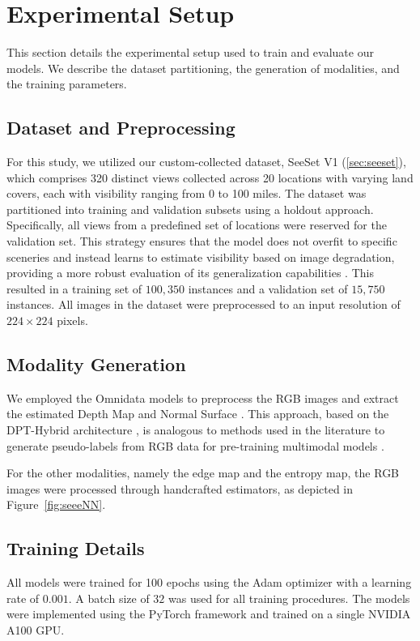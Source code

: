 \section{Experimental Setup}
\label{sec:experimental_setup}

This section details the experimental setup used to train and evaluate our models. We describe the dataset partitioning, the generation of modalities, and the training parameters.

\subsection{Dataset and Preprocessing}

For this study, we utilized our custom-collected dataset, SeeSet V1 (\ref{sec:seeset}), which comprises 320 distinct views collected across 20 locations with varying land covers, each with visibility ranging from 0 to 100 miles. The dataset was partitioned into training and validation subsets using a holdout approach. Specifically, all views from a predefined set of locations were reserved for the validation set. This strategy ensures that the model does not overfit to specific sceneries and instead learns to estimate visibility based on image degradation, providing a more robust evaluation of its generalization capabilities \cite{Bouhsine2022}. This resulted in a training set of $100,350$ instances and a validation set of $15,750$ instances. All images in the dataset were preprocessed to an input resolution of $224 \times 224$ pixels.

\subsection{Modality Generation}

We employed the Omnidata models to preprocess the RGB images and extract the estimated Depth Map and Normal Surface \cite{eftekhar2021omnidata}. This approach, based on the DPT-Hybrid architecture \cite{ranftl2021vision}, is analogous to methods used in the literature to generate pseudo-labels from RGB data for pre-training multimodal models \cite{bachmann2022multimae, wang2024largescale}.

For the other modalities, namely the edge map and the entropy map, the RGB images were processed through handcrafted estimators, as depicted in Figure~\ref{fig:seeeNN}.

\subsection{Training Details}

All models were trained for 100 epochs using the Adam optimizer with a learning rate of $0.001$. A batch size of $32$ was used for all training procedures. The models were implemented using the PyTorch framework and trained on a single NVIDIA A100 GPU.




